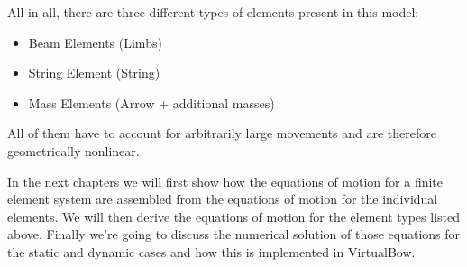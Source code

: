 \newpage
All in all, there are three different types of elements present in this model:

\begin{itemize}
\item Beam Elements (Limbs)
\item String Element (String)
\item Mass Elements (Arrow + additional masses)
\end{itemize}

All of them have to account for arbitrarily large movements and are therefore geometrically nonlinear.

In the next chapters we will first show how the equations of motion for a finite element system are assembled from the equations of motion for the individual elements.
We will then derive the equations of motion for the element types listed above.
Finally we're going to discuss the numerical solution of those equations for the static and dynamic cases and how this is implemented in VirtualBow.